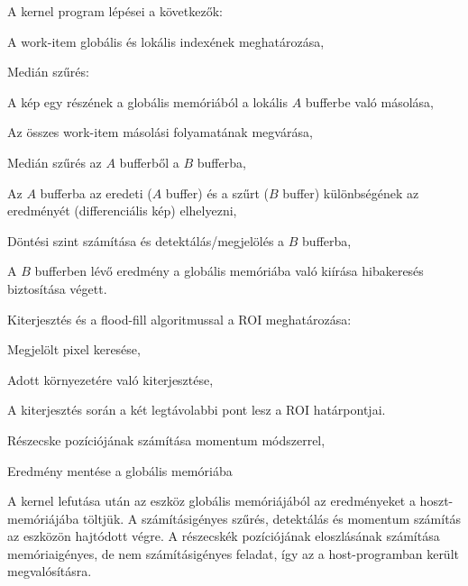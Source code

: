 	\noindent A kernel program lépései a következők:
	\begin{enumerate*}
		\item A work-item globális és lokális indexének meghatározása,
		\item Medián szűrés:
		\begin{enumerate*}
			\item A kép egy részének a globális memóriából a lokális $A$ bufferbe való másolása,
			\item Az összes work-item másolási folyamatának megvárása,
			\item Medián szűrés az $A$ bufferből a $B$ bufferba,
			\item Az $A$ bufferba az eredeti ($A$ buffer) és a szűrt ($B$ buffer) különbségének az eredményét
			(differenciális kép) elhelyezni,
			\item Döntési szint számítása és detektálás/megjelölés a $B$ bufferba,
			\item A $B$ bufferben lévő eredmény a globális memóriába való kiírása hibakeresés biztosítása
			végett.
		\end{enumerate*}
		\item Kiterjesztés és a flood-fill algoritmussal a ROI meghatározása:
		\begin{enumerate*}
			\item Megjelölt pixel keresése,
			\item Adott környezetére való kiterjesztése,
			\item A kiterjesztés során a két legtávolabbi pont lesz a ROI határpontjai.
		\end{enumerate*}
		\item Részecske pozíciójának számítása momentum módszerrel,
		\item Eredmény mentése a globális memóriába
	\end{enumerate*}
	
	A kernel lefutása után az eszköz globális memóriájából az eredményeket a hoszt-memóriájába töltjük.
	A számításigényes szűrés, detektálás és momentum számítás az eszközön hajtódott végre. A részecskék
	pozíciójának eloszlásának számítása memóriaigényes, de nem számításigényes feladat, így az a
	host-programban került megvalósításra.

	
